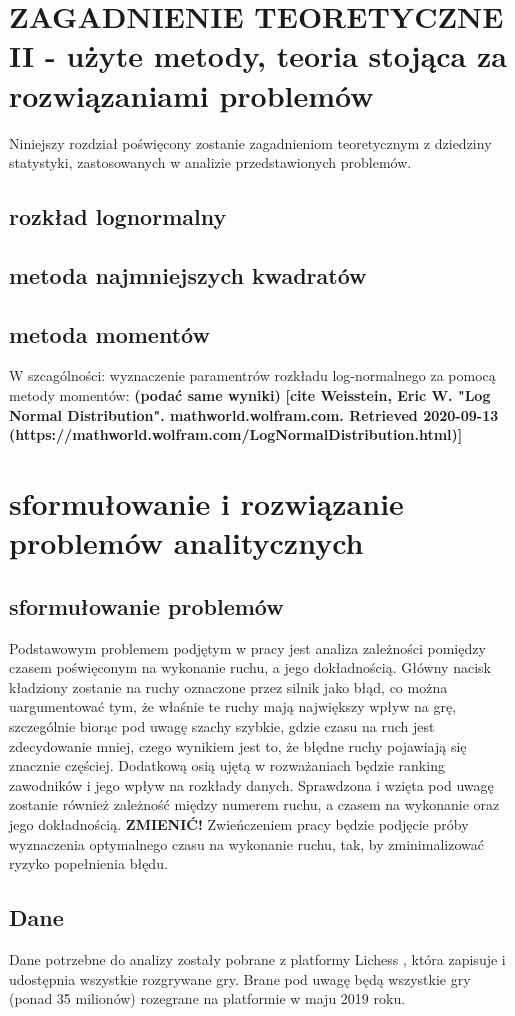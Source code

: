 \documentclass[inzynierska]{pwr_wmat_praca_dyplomowa}
\theoremstyle{plain}
\numberwithin{theorem}{chapter}
\theoremstyle{definition}
\numberwithin{theorem}{chapter}
\begin{document}
\chapter{ZAGADNIENIE TEORETYCZNE II - użyte metody, teoria stojąca za rozwiązaniami problemów}
Niniejszy rozdział poświęcony zostanie zagadnieniom teoretycznym z dziedziny statystyki, zastosowanych w analizie przedstawionych problemów.
\section{rozkład lognormalny}
\section{metoda najmniejszych kwadratów}
\section{metoda momentów}
W szcagólności: wyznaczenie paramentrów rozkładu log-normalnego za pomocą metody momentów: \textbf{(podać same wyniki)}
\textbf{[cite Weisstein, Eric W. "Log Normal Distribution". mathworld.wolfram.com. Retrieved 2020-09-13 (https://mathworld.wolfram.com/LogNormalDistribution.html)]}
\chapter{sformułowanie i rozwiązanie problemów analitycznych}
\section{sformułowanie problemów}
Podstawowym problemem podjętym w pracy jest analiza zależności pomiędzy czasem poświęconym na wykonanie ruchu, a jego dokładnością. Główny nacisk kładziony zostanie na ruchy oznaczone przez silnik jako błąd, co można uargumentować tym, że właśnie te ruchy mają największy wpływ na grę, szczególnie biorąc pod uwagę szachy szybkie, gdzie czasu na ruch jest zdecydowanie mniej, czego wynikiem jest to, że błędne ruchy pojawiają się znacznie częściej. Dodatkową osią ujętą w rozważaniach będzie ranking zawodników i jego wpływ na rozkłady danych. Sprawdzona i wzięta pod uwagę zostanie również zależność między numerem ruchu, a czasem na wykonanie oraz jego dokładnością.
\textbf{ZMIENIĆ!} Zwieńczeniem pracy będzie podjęcie próby wyznaczenia optymalnego czasu na wykonanie ruchu, tak, by zminimalizować ryzyko popełnienia błędu.

\section{Dane}
Dane potrzebne do analizy zostały pobrane z platformy Lichess \cite{lichess}, która zapisuje i udostępnia wszystkie rozgrywane gry. Brane pod uwagę będą wszystkie gry (ponad 35 milionów) rozegrane na platformie w maju 2019 roku.
\end{document}
